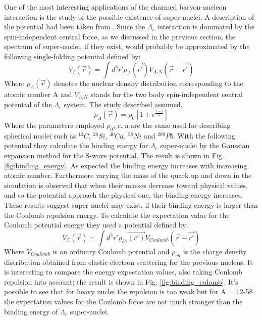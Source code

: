 \documentclass[12pt,a4paper]{book}
\begin{document}
	One of the most interesting applications of the charmed baryon-nucleon interaction is the study of the possible existence of super-nuclei. A description of the potential had been taken from \cite{MIYAMOTO2018113}. Since the $\Lambda_c$ interaction is dominated by the spin-independent central force, as we discussed in the previous section, the spectrum of super-nuclei, if they exist, would probably be approximated by the following single-folding potential defined by:
	\begin{equation}
		V_f(\vec{r}) = \int d^3r' \rho_A (\vec{r'}) V_{\Lambda_cN} (\vec{r}- \vec{r'}) 
	\end{equation}
	Where $\rho_A(\vec{r})$ denotes the nuclear density distribution corresponding to the atomic number A and $V_{\Lambda_cN}$ stands for the two body spin-independent central potential of the $\Lambda_c$ system. The study described assumed,
	\begin{equation}
		\rho_A(\vec{r})=\rho_0 \left[1+ e^{\frac{r-c}{a}}\right]
	\end{equation}
	Where the parameters employed $\rho_0$, c, a are the same used for describing spherical nuclei such as $^{12}C$, $^{28}Si$, $^{40}Ca$, $^{58}Ni$ and $^{208}Pb$.
	With the following potential they calculate the binding energy for $\Lambda_c$ super-nuclei by the Gaussian expansion method for the S-wave potential. The result is shown in Fig. \ref{fig:binding_energy}. As expected the binding energy increases with increasing atomic number. Furthermore varying the mass of the quark up and down in the simulation is observed that when their masses decrease toward physical values, and so the potential approach the physical one, the binding energy increases. These results suggest super-nuclei may exist, if their binding energy is larger than the Coulomb repulsion energy. To calculate the expectation value for the Coulomb potential energy they used a potential defined by:
	\begin{equation}
		V_C(\vec{r})= \int d^3 r' \rho_{ch}\vec{(r')} V_{Coulomb}(\vec{r}-\vec{r'})
	\end{equation}
	Where $V_{Coulomb}$ is an ordinary Coulomb potential and $\rho_{ch}$ is the charge density distribution obtained from elastic electron scattering for the previous nucleus. It is interesting to compare the energy expectation values, also taking Coulomb repulsion into account; the result is shown in Fig. \ref{fig:binding_culomb}. It's possible to see that for heavy nuclei the repulsion is too weak but for A = 12-58 the expectation values for the Coulomb force are not much stronger than the binding energy of $\Lambda_c$ super-nuclei. 
	
\end{document}
